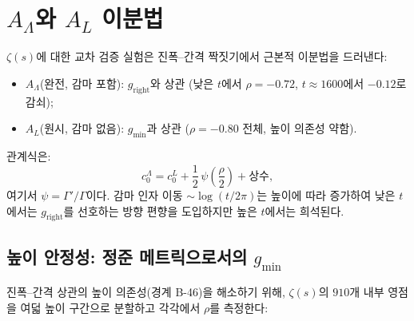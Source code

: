 \documentclass[11pt,a4paper]{article}
\theoremstyle{plain}
\theoremstyle{definition}
\newcommand{\La}{\Lambda}
\begin{document}
\section{$A_\La$와 $A_L$ 이분법}
\label{sec:dichotomy}

$\zeta(s)$에 대한 교차 검증 실험은 진폭--간격 짝짓기에서
근본적 이분법을 드러낸다:
\begin{itemize}
  \item $A_\La$(완전, 감마 포함): $g_{\mathrm{right}}$와 상관
        (낮은 $t$에서 $\rho = -0.72$, $t \approx 1600$에서 $-0.12$로 감쇠);
  \item $A_L$(원시, 감마 없음): $g_{\min}$과 상관
        ($\rho = -0.80$ 전체, 높이 의존성 약함).
\end{itemize}

관계식은:
\begin{equation}\label{eq:AL_ALambda}
  c_0^\La = c_0^L + \frac{1}{2}\,\psi\!\left(\frac{\rho}{2}\right)
  + \text{상수},
\end{equation}
여기서 $\psi = \Gamma'/\Gamma$이다. 감마 인자 이동
$\sim \log(t/2\pi)$는 높이에 따라 증가하여
낮은 $t$에서는 $g_{\mathrm{right}}$를 선호하는 방향 편향을 도입하지만
높은 $t$에서는 희석된다.

\subsection{높이 안정성: 정준 메트릭으로서의 $g_{\min}$}
\label{subsec:height_stability}

진폭--간격 상관의 높이 의존성(경계 B-46)을 해소하기 위해,
$\zeta(s)$의 $910$개 내부 영점을 여덟 높이 구간으로 분할하고
각각에서 $\rho$를 측정한다:
\end{document}
